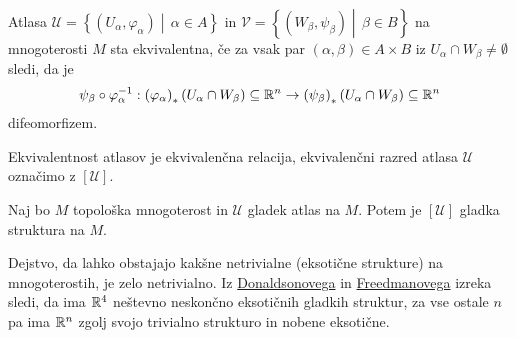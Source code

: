 \begin{definicija} \label{def_ekvivalnentnost_atlasov} Atlasa
$\mathcal{U} = \left\{ \left( U_\alpha, \varphi_\alpha \right)
\middle|\, \alpha \in A\right\}$ in $\mathcal{V} = \left\{
\left( W_\beta, \psi_\beta \right) \middle|\,  \beta
\in  B\right\}$ na mnogoterosti $M$ sta ekvivalentna, če za
vsak par $\left( \alpha, \beta \right) \in  A \times  B$ iz
$U_\alpha \cap  W_\beta \neq \emptyset$ sledi, da je \begin{equation*}
\psi_\beta \circ \varphi_\alpha^{-1} : \left(
\varphi_\alpha \right)_{*}\left( U_\alpha \cap W_\beta \right)
\subseteq  \mathbb{R} ^n \to \left( \psi_\beta \right)_{*}\left(
U_\alpha \cap W_\beta \right)\subseteq \mathbb{R} ^n \end{equation*} difeomorfizem.
\end{definicija}

\begin{opomba}
Ekvivalentnost atlasov je ekvivalenčna relacija,
ekvivalenčni razred atlasa $\mathcal{U}$ označimo z $\left[
\mathcal{U} \right].$ 
\end{opomba}

\begin{definicija} \label{def_gladka_struktura} Naj bo $M$ topološka
mnogoterost in $\mathcal{U}$ gladek atlas na $M$. Potem je $\left[
\mathcal{U} \right]$ gladka struktura na $M$.    
\end{definicija}

\begin{opomba} Dejstvo, da lahko obstajajo kakšne netrivialne
(eksotične strukture) na mnogoterostih, je zelo netrivialno. Iz
\href{https://en.wikipedia.org/wiki/Donaldson%27s_theorem}{Donaldsonovega}
in \href{https://mathworld.wolfram.com/FreedmanTheorem.html}{Freedmanovega}
izreka sledi, da ima $\mathbb{R} ^{4}$ neštevno neskončno
eksotičnih gladkih struktur, za vse ostale $n$ pa ima $\mathbb{R} ^n$ 
zgolj svojo trivialno strukturo in nobene eksotične.
\end{opomba}